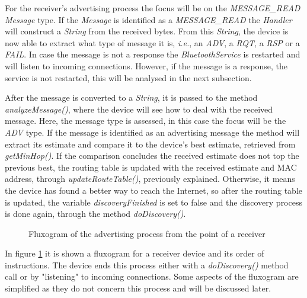 For the receiver's advertising process the focus will be on the \textit{MESSAGE\_READ} \textit{Message} type. If the \textit{Message} is identified as a \textit{MESSAGE\_READ} the \textit{Handler} will construct a \textit{String} from the received bytes. From this \textit{String}, the device is now able to extract what type of message it is, \textit{i.e.}, an \textit{ADV}, a \textit{RQT}, a \textit{RSP} or a \textit{FAIL}. In case the message is not a response the \textit{BluetoothService} is restarted and will listen to incoming connections. However, if the message is a response, the service is not restarted, this will be analysed in the next subsection.

After the message is converted to a \textit{String}, it is passed to the method \textit{analyzeMessage()}, where the device will see how to deal with the received message. Here, the message type is assessed, in this case the focus will be the \textit{ADV} type. If the message is identified as an advertising message the method will extract its estimate and compare it to the device's best estimate, retrieved from \textit{getMinHop()}. If the comparison concludes the received estimate does not top the previous best, the routing table is updated with the received estimate and \gls{MAC} address, through \textit{updateRouteTable()}, previously explained. Otherwise, it means the device has found a better way to reach the Internet, so after the routing table is updated, the variable \textit{discoveryFinished} is set to false and the discovery process is done again, through the method \textit{doDiscovery()}.

\begin{figure}[ht]
   \noindent{}
	\caption{\label{fig:recvadvflux} Fluxogram of the advertising process from the point of a receiver}
\end{figure}

In figure \ref{fig:recvadvflux} it is shown a fluxogram for a receiver device and its order of instructions. The device ends this process either with a \textit{doDiscovery()} method call or by "listening" to incoming connections. Some aspects of the fluxogram are simplified as they do not concern this process and will be discussed later.

